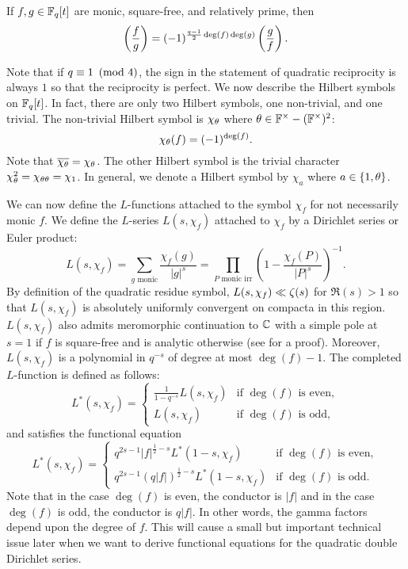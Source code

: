 \documentclass[12pt,reqno,oneside]{amsart}
\begin{document}
    \begin{theorem}
        If $f,g \in \mathbb{F}_{q}[t]$ are monic, square-free, and relatively prime, then
        \[
            \left(\frac{f}{g}\right) = (-1)^{\frac{q-1}{2}\deg(f)\deg(g)}\left(\frac{g}{f}\right).
        \]
    \end{theorem}

    Note that if $q \equiv 1 \ \left(\text{mod }4\right)$, the sign in the statement of quadratic reciprocity is always $1$ so that the reciprocity is perfect. We now describe the Hilbert symbols on $\mathbb{F}_{q}[t]$. In fact, there are only two Hilbert symbols, one non-trivial, and one trivial. The non-trivial Hilbert symbol is $\chi_{\theta}$ where $\theta \in \mathbb{F}^{\times}-(\mathbb{F}^{\times})^{2}$:
    \[
        \chi_{\theta}(f) = (-1)^{\deg(f)}.
    \]
    Note that $\overline{\chi_{\theta}} = \chi_{\theta}$. The other Hilbert symbol is the trivial character $\chi_{\theta}^{2} = \chi_{\theta\theta} = \chi_{1}$. In general, we denote a Hilbert symbol by $\chi_{a}$ where $a \in \{1,\theta\}$.

    We can now define the $L$-functions attached to the symbol $\chi_{f}$ for not necessarily monic $f$. We define the $L$-series $L(s,\chi_{f})$ attached to $\chi_{f}$ by a Dirichlet series or Euler product:
    \[
        L(s,\chi_{f}) = \sum_{\text{$g$ monic}}\frac{\chi_{f}(g)}{|g|^{s}} = \prod_{\text{$P$ monic irr}}\left(1-\frac{\chi_{f}(P)}{|P|^{s}}\right)^{-1}.
    \]
    By definition of the quadratic residue symbol, $L(s,\chi_{f}) \ll \zeta(s)$ for $\Re(s) > 1$ so that $L(s,\chi_{f})$ is absolutely uniformly convergent on compacta in this region. $L(s,\chi_{f})$ also admits meromorphic continuation to $\mathbb{C}$ with a simple pole at $s = 1$ if $f$ is square-free and is analytic otherwise (see \cite{R} for a proof). Moreover, $L(s,\chi_{f})$ is a polynomial in $q^{-s}$ of degree at most $\deg(f)-1$. The completed $L$-function is defined as follows:
    \[
        L^{\ast}(s,\chi_{f}) = \begin{cases} \frac{1}{1-q^{-s}}L(s,\chi_{f}) & \text{if $\deg(f)$ is even}, \\ L(s,\chi_{f}) & \text{if $\deg(f)$ is odd}, \end{cases}
    \]
    and satisfies the functional equation
    \[
        L^{\ast}(s,\chi_{f}) = \begin{cases} q^{2s-1}|f|^{\frac{1}{2}-s}L^{\ast}(1-s,\chi_{f}) & \text{if $\deg(f)$ is even}, \\ q^{2s-1}(q|f|)^{\frac{1}{2}-s}L^{\ast}(1-s,\chi_{f}) & \text{if $\deg(f)$ is odd}. \end{cases}
    \]
    Note that in the case $\deg(f)$ is even, the conductor is $|f|$ and in the case $\deg(f)$ is odd, the conductor is $q|f|$. In other words, the gamma factors depend upon the degree of $f$. This will cause a small but important technical issue later when we want to derive functional equations for the quadratic double Dirichlet series.
\end{document}
